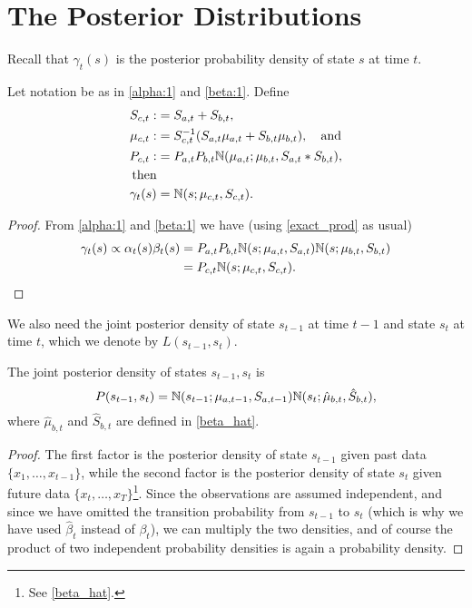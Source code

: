 \documentclass[12pt,leqno]{article}
\begin{document}
\section{The Posterior Distributions}

Recall that $\gamma_t(s)$ is the posterior probability density of state $s$
at time $t$. 
\begin{Thm}
  Let notation be as in \eqref{alpha:1} and \eqref{beta:1}.  Define
\begin{align*}
  S_{c,t} :&= S_{a,t} + S_{b,t}, \\
  \mu_{c,t} :&= S_{c,t}^{-1}(S_{a,t}\mu_{a,t} + S_{b,t}\mu_{b,t}), \quad\text{and}\\
  P_{c,t} :&= P_{a,t}P_{b,t}{\mathbb N}(\mu_{a,t};\mu_{b,t},S_{a,t}*S_{b,t}), \\
  \text{then} \\
 \gamma_t(s) &= {\mathbb N}(s;\mu_{c,t},S_{c,t}).
\end{align*}

\end{Thm}
\begin{proof}
  From \eqref{alpha:1} and \eqref{beta:1} we have (using \eqref{exact_prod}
  as usual)
  \begin{align*}
  \gamma_t(s) \propto \alpha_t(s)\beta_t(s) &= P_{a,t}P_{b,t}{\mathbb N}(s;\mu_{a,t},S_{a,t}){\mathbb N}(s;\mu_{b,t},S_{b,t})\\
  &= P_{c,t}{\mathbb N}(s;\mu_{c,t},S_{c,t}).
  \end{align*}
\end{proof}

We also need the joint posterior density of state $s_{t-1}$ at time $t-1$ and state $s_t$ at time $t$,
which we denote by $L(s_{t-1},s_t)$.
\begin{Lem} \label{gamma_hat}
  The joint posterior density of states $s_{t-1},s_t$ is
$$
  P(s_{t-1},s_t) =  {\mathbb N}(s_{t-1}; \mu_{a,t-1},S_{a,t-1}){\mathbb N}(s_t;\hat{\mu}_{b,t},\hat{S}_{b,t}),
  $$
  where $\hat{\mu}_{b,t}$ and $\hat{S}_{b,t}$ are defined in \eqref{beta_hat}.
\end{Lem}
\begin{proof}
  The first factor is the posterior density of state $s_{t-1}$ given past data $\{x_1,\dots,x_{t-1}\}$, while the second factor is the posterior density of state $s_t$ given future data $\{x_t,\dots,x_T\}$\footnote{See \eqref{beta_hat}.}.
  Since the observations are assumed independent, and since we have omitted the transition probability from $s_{t-1}$ to $s_t$ (which is why we have used $\hat{\beta}_t$ instead of $\beta_t$), we can multiply the two densities, and
  of course the product of two independent probability densities is again a probability density.
\end{proof}
\end{document}
